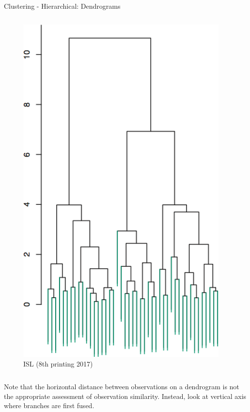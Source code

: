\begin{frame}[allowframebreaks]{Clustering - Hierarchical: Dendrograms}
\begin{columns}
    \begin{column}{0.55\textwidth}
        \begin{figure}
            \centering
            \includegraphics[width=0.95\textwidth,height=0.8\textheight,keepaspectratio]{images/dul/hierarchical/dendrograms.png}
            \caption{ISL (8th printing 2017)}
        \end{figure}
    \end{column}
\end{columns}

\framebreak

\begin{block}{}
    Note that the horizontal distance between observations on a  dendrogram is not the appropriate assessment of observation  similarity. Instead, look at vertical axis where branches are first fused.


\end{block}
\end{frame}
